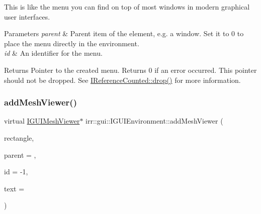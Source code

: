 This is like the menu you can find on top of most windows in modern graphical user interfaces. 
\begin{DoxyParams}{Parameters}
{\em parent} & Parent item of the element, e.\+g. a window. Set it to 0 to place the menu directly in the environment. \\
\hline
{\em id} & An identifier for the menu. \\
\hline
\end{DoxyParams}
\begin{DoxyReturn}{Returns}
Pointer to the created menu. Returns 0 if an error occurred. This pointer should not be dropped. See \hyperlink{classirr_1_1IReferenceCounted_a03856a09355b89d178090c4a5f738543}{I\+Reference\+Counted\+::drop()} for more information. 
\end{DoxyReturn}
\mbox{\label{classirr_1_1gui_1_1IGUIEnvironment_a4e35088a4346e5a80d1362e406a628e2}} 
\subsubsection{\texorpdfstring{add\+Mesh\+Viewer()}{addMeshViewer()}\hspace{0.1cm}{\footnotesize\ttfamily [1/2]}}
{\footnotesize\ttfamily virtual \hyperlink{classirr_1_1gui_1_1IGUIMeshViewer}{I\+G\+U\+I\+Mesh\+Viewer}$\ast$ irr\+::gui\+::\+I\+G\+U\+I\+Environment\+::add\+Mesh\+Viewer (\begin{DoxyParamCaption}\item[{const \hyperlink{classirr_1_1core_1_1rect}{core\+::rect}$<$ \hyperlink{namespaceirr_ac66849b7a6ed16e30ebede579f9b47c6}{s32} $>$ \&}]{rectangle,  }\item[{\hyperlink{classirr_1_1gui_1_1IGUIElement}{I\+G\+U\+I\+Element} $\ast$}]{parent = {},  }\item[{\hyperlink{namespaceirr_ac66849b7a6ed16e30ebede579f9b47c6}{s32}}]{id = {\ttfamily -\/1},  }\item[{const wchar\+\_\+t $\ast$}]{text = {} }\end{DoxyParamCaption})\hspace{0.3cm}{\ttfamily [pure virtual]}}



